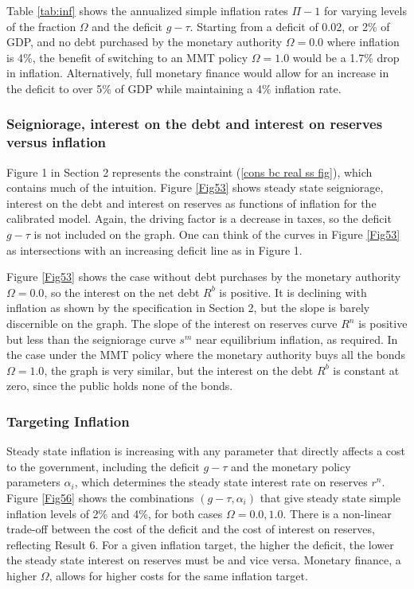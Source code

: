 \documentclass[]{article}
\begin{document}
Table \ref{tab:inf} shows the annualized simple inflation rates $\Pi-1$ for varying levels of the fraction $\Omega$ and the deficit $g-\tau$. Starting from a deficit of 0.02, or 2\% of GDP, and no debt purchased by the monetary authority $\Omega=0.0$ where inflation is 4\%, the benefit of switching to an MMT policy $\Omega=1.0$ would be a 1.7\% drop in inflation. Alternatively, full monetary finance would allow for an increase in the deficit to over 5\% of GDP while maintaining a 4\% inflation rate.

\subsubsection{Seigniorage, interest on the debt and interest on reserves versus inflation}

Figure 1 in Section 2 represents the constraint (\ref{cons bc real ss fig}), which contains much of the intuition. Figure \ref{Fig53} shows steady state seigniorage, interest on the debt and interest on reserves as functions of inflation for the calibrated model. Again, the driving factor is a decrease in taxes, so the deficit $g-\tau$ is not included on the graph. One can think of the curves in Figure \ref{Fig53} as intersections with an increasing deficit line as in Figure 1.

Figure \ref{Fig53} shows the case without debt purchases by the monetary authority $\Omega=0.0$, so the interest on the net debt $R^{b}$ is positive. It is declining with inflation as shown by the specification in Section 2, but the slope is barely discernible on the graph. The slope of the interest on reserves curve $R^{n}$ is positive but less than the seigniorage curve $s^{m}$ near equilibrium inflation, as required. In the case under the MMT policy where the monetary authority buys all the bonds $\Omega=1.0$, the graph is very similar, but the interest on the debt $R^{b}$ is constant at zero, since the public holds none of the bonds.

\subsubsection{Targeting Inflation}

Steady state inflation is increasing with any parameter that directly affects a cost to the government, including the deficit $g-\tau$ and the monetary policy parameters $\alpha_{i}$, which determines the steady state interest rate on reserves $r^{n}$. Figure \ref{Fig56} shows the combinations $(g-\tau,\alpha_{i})$ that give steady state simple inflation levels of 2\% and 4\%, for both cases $\Omega=0.0,1.0$. There is a non-linear trade-off between the cost of the deficit and the cost of interest on reserves, reflecting Result 6. For a given inflation target, the higher the deficit, the lower the steady state interest on reserves must be and vice versa. Monetary finance, a higher $\Omega$, allows for higher costs for the same inflation target.
\end{document}
